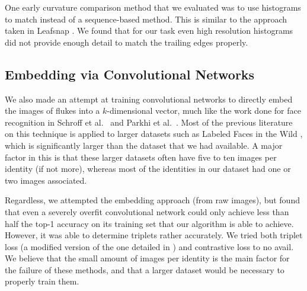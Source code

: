 One early curvature comparison method that we evaluated was to use histograms to match instead of a sequence-based method.
This is similar to the approach taken in Leafsnap \cite{kumar2012leafsnap}.
We found that for our task even high resolution histograms did not provide enough detail to match the trailing edges properly.

\subsection{Embedding via Convolutional Networks}
\label{sec:embedding}

We also made an attempt at training convolutional networks to directly embed the images of flukes into a $k$-dimensional vector, much like the work done for face recognition in Schroff et al.\ \cite{schroff2015facenet} and Parkhi et al.\ \cite{parkhi2015deep}.
Most of the previous literature on this technique is applied to larger datasets such as Labeled Faces in the Wild \cite{huang2007labeled}, which is significantly larger than the dataset that we had available.
A major factor in this is that these larger datasets often have five to ten images per identity (if not more), whereas most of the identities in our dataset had one or two images associated.

Regardless, we attempted the embedding approach (from raw images), but found that even a severely overfit convolutional network could only achieve less than half the top-1 accuracy on its training set that our algorithm is able to achieve.
However, it was able to determine triplets rather accurately.
We tried both triplet loss (a modified version of the one detailed in \cite{schroff2015facenet}) and contrastive loss \cite{hadsell2006dimensionality} to no avail.
We believe that the small amount of images per identity is the main factor for the failure of these methods, and that a larger dataset would be necessary to properly train them.

